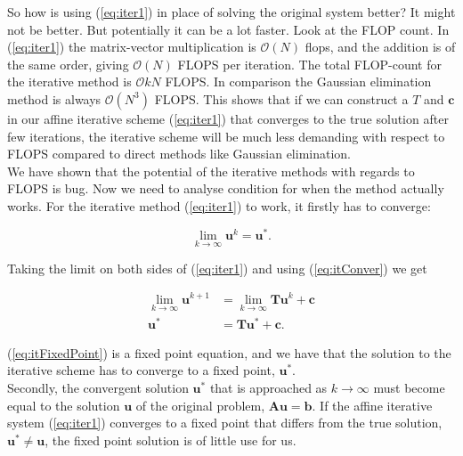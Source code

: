 \documentclass{article}
\begin{document}
So how is using (\ref{eq:iter1}) in place of solving the original system better? It might not be better. But potentially it can be a lot faster. Look at the FLOP count. In (\ref{eq:iter1}) the matrix-vector multiplication is $\mathcal{O}(N)$ flops, and the addition is of the same order, giving $\mathcal{O}(N)$ FLOPS per iteration. The total FLOP-count for the iterative method is $\mathcal{O}{kN}$ FLOPS. In comparison the Gaussian elimination method is always $\mathcal{O}(N^3)$ FLOPS. This shows that if we can construct a $T$ and $\mathbf{c}$ in our affine iterative scheme (\ref{eq:iter1}) that converges to the true solution after few iterations, the iterative scheme will be much less demanding with respect to FLOPS compared to direct methods like Gaussian elimination.\\

We have shown that the potential of the iterative methods with regards to FLOPS is bug. Now we need to analyse condition for when the method actually works. For the iterative method (\ref{eq:iter1}) to work, it firstly has to converge: 

\begin{equation}\label{eq:itConver}
	\lim_{k \rightarrow \infty} \mathbf{u}^{k} = \mathbf{u}^{*}.
\end{equation}

Taking the limit on both sides of (\ref{eq:iter1}) and using (\ref{eq:itConver}) we get

\begin{subequations}
	\begin{align}
			\lim_{k \rightarrow \infty} \mathbf{u}^{k+1} &= 	\lim_{k \rightarrow \infty} \mathbf{T} \mathbf{u}^k + \mathbf{c}\\
			\mathbf{u}^{*} &= \mathbf{T} \mathbf{u}^{*} + \mathbf{c}.\label{eq:itFixedPoint}
	\end{align}
\end{subequations}

(\ref{eq:itFixedPoint}) is a fixed point equation, and we have that the solution to the iterative scheme has to converge to a fixed point, $\mathbf{u^{*}}$.\\
 
Secondly, the convergent solution $\mathbf{u}^{*}$ that is approached  as $k \rightarrow \infty$ must become equal to the solution $\mathbf{u}$ of the original problem, $\mathbf{A}\mathbf{u} = \mathbf{b}$. If the affine iterative system (\ref{eq:iter1}) converges to a fixed point that differs from the true solution, $\mathbf{u}^{*} \neq \mathbf{u}$, the fixed point solution is of little use for us.\\
\end{document}
